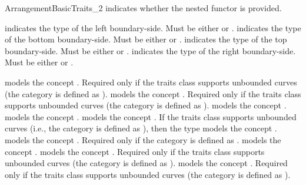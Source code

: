 \begin{ccRefConcept}{ArrangementBasicTraits_2}
  {indicates whether the nested functor  is
  provided.} 

  {indicates the type of the left boundary-side. Must be either
   or .}
  {indicates the type of the bottom boundary-side. Must be either
   or .}
  {indicates the type of the top boundary-side. Must be either
   or .}
  {indicates the type of the right boundary-side. Must be either
   or .}

\ccThreeToTwo
{}
\ccGlue
{}
\ccGlue
{}
  {models the concept .
  Required only if the traits class supports unbounded curves
  (the  category is defined as ).}
\ccGlue
{}
  {models the concept .
  Required only if the traits class supports unbounded curves
  (the  category is defined as ).}
\ccGlue
{}
  {models the concept .}
\ccGlue
{}
  {models the concept .}
\ccGlue
{}
\ccGlue
{}
  {models the concept .
  If the traits class supports unbounded curves (i.e., the
   category is defined as ), then
  the type models the concept .}
\ccGlue
{}
  {models the concept .
  Required only if the  category is defined as
  .}
\ccGlue
{}
  {models the concept .}
\ccGlue
{}
\ccGlue
{}
  {models the concept .
  Required only if the traits class supports unbounded curves
  (the  category is defined as ).}
\ccGlue
{}
  {models the concept .
  Required only if the traits class supports unbounded curves
  (the  category is defined as ).}


\end{ccRefConcept}
